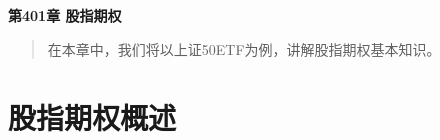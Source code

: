 \newpage
\maketitle
\begin{center}
\Large \textbf{第401章 股指期权} \quad 
\end{center}
\begin{abstract}
在本章中，我们将以上证50ETF为例，讲解股指期权基本知识。
\end{abstract}
\section{股指期权概述}
